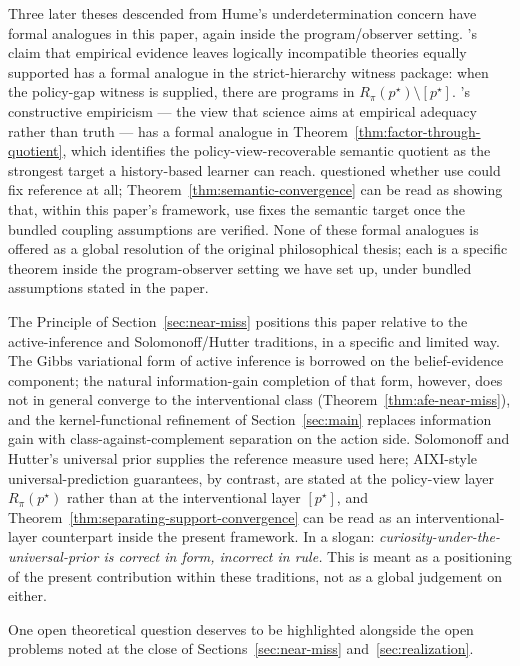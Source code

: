 \documentclass[11pt]{article}
\theoremstyle{definition}
\theoremstyle{remark}
\theoremstyle{plain}
\theoremstyle{definition}
\begin{document}
Three later theses descended from Hume's underdetermination concern have formal analogues in this paper, again inside the program/observer setting. \citet{Quine1960}'s claim that empirical evidence leaves logically incompatible theories equally supported has a formal analogue in the strict-hierarchy witness package: when the policy-gap witness is supplied, there are programs in $R_\pi(p^\star)\setminus[p^\star]$. \citet{vanFraassen1980}'s constructive empiricism --- the view that science aims at empirical adequacy rather than truth --- has a formal analogue in Theorem~\ref{thm:factor-through-quotient}, which identifies the policy-view-recoverable semantic quotient as the strongest target a history-based learner can reach. \citet{Putnam1980} questioned whether use could fix reference at all; Theorem~\ref{thm:semantic-convergence} can be read as showing that, within this paper's framework, use fixes the semantic target once the bundled coupling assumptions are verified. None of these formal analogues is offered as a global resolution of the original philosophical thesis; each is a specific theorem inside the program-observer setting we have set up, under bundled assumptions stated in the paper.

The Principle of Section~\ref{sec:near-miss} positions this paper relative to the active-inference and Solomonoff/Hutter traditions, in a specific and limited way. The Gibbs variational form of active inference is borrowed on the belief-evidence component; the natural information-gain completion of that form, however, does not in general converge to the interventional class (Theorem~\ref{thm:afe-near-miss}), and the kernel-functional refinement of Section~\ref{sec:main} replaces information gain with class-against-complement separation on the action side. Solomonoff and Hutter's universal prior supplies the reference measure used here; AIXI-style universal-prediction guarantees, by contrast, are stated at the policy-view layer $R_\pi(p^\star)$ rather than at the interventional layer $[p^\star]$, and Theorem~\ref{thm:separating-support-convergence} can be read as an interventional-layer counterpart inside the present framework. In a slogan: \emph{curiosity-under-the-universal-prior is correct in form, incorrect in rule.} This is meant as a positioning of the present contribution within these traditions, not as a global judgement on either.

One open theoretical question deserves to be highlighted alongside the open problems noted at the close of Sections~\ref{sec:near-miss} and~\ref{sec:realization}.
\end{document}
